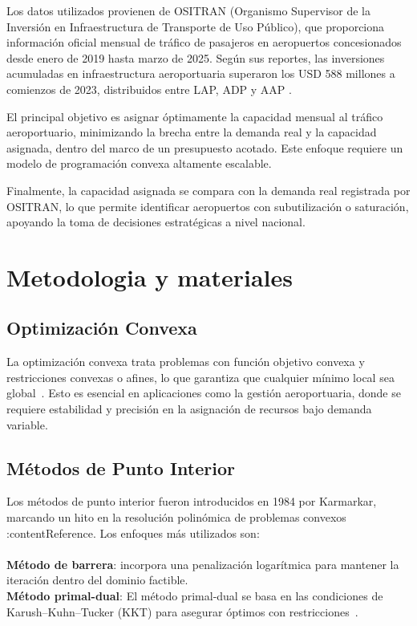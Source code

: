 \documentclass[11pt, a4paper, twocolumn]{article}
\begin{document}
Los datos utilizados provienen de OSITRAN (Organismo Supervisor de la Inversión en Infraestructura de Transporte de Uso Público), que proporciona información oficial mensual de tráfico de pasajeros en aeropuertos concesionados desde enero de 2019 hasta marzo de 2025. Según sus reportes, las inversiones acumuladas en infraestructura aeroportuaria superaron los USD 588 millones a comienzos de 2023, distribuidos entre LAP, ADP y AAP \citep{ositran2023inversion}.

El principal objetivo es asignar óptimamente la capacidad mensual al tráfico aeroportuario, minimizando la brecha entre la demanda real y la capacidad asignada, dentro del marco de un presupuesto acotado. Este enfoque requiere un modelo de programación convexa altamente escalable.

Finalmente, la capacidad asignada se compara con la demanda real registrada por OSITRAN, lo que permite identificar aeropuertos con subutilización o saturación, apoyando la toma de decisiones estratégicas a nivel nacional.

\section{Metodologia y materiales}

\subsection{Optimización Convexa}
La optimización convexa trata problemas con función objetivo convexa y restricciones convexas o afines, lo que garantiza que cualquier mínimo local sea global \citep{convex_global_minimum}. Esto es esencial en aplicaciones como la gestión aeroportuaria, donde se requiere estabilidad y precisión en la asignación de recursos bajo demanda variable.


\subsection{Métodos de Punto Interior}
Los métodos de punto interior fueron introducidos en 1984 por Karmarkar, marcando un hito en la resolución polinómica de problemas convexos :contentReference. Los enfoques más utilizados son: \\
\\
\textbf{Método de barrera}: incorpora una penalización logarítmica para mantener la iteración dentro del dominio factible. \\
\textbf{Método primal-dual}: El método primal‑dual se basa en las condiciones de Karush–Kuhn–Tucker (KKT) para asegurar óptimos con restricciones \citep{KKT_wiki}.
\end{document}
